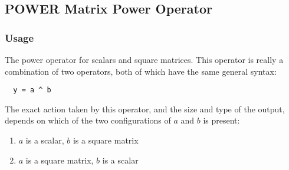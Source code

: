 %
%
%
\subsection{POWER Matrix Power Operator}
\subsubsection{Usage}
The power operator for scalars and square matrices.  This operator is really a 
combination of two operators, both of which have the same general syntax:
\begin{verbatim}
  y = a ^ b
\end{verbatim}
The exact action taken by this operator, and the size and type of the output, 
depends on which of the two configurations of $a$ and $b$ is present:
\begin{enumerate}
  \item $a$ is a scalar, $b$ is a square matrix
  \item $a$ is a square matrix, $b$ is a scalar
\end{enumerate}
